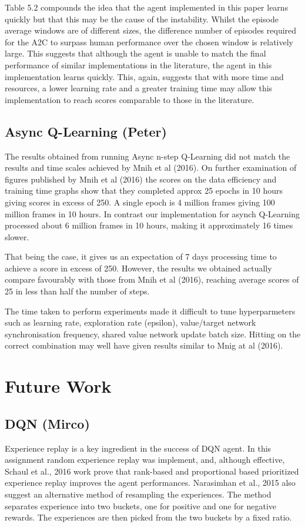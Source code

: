 \documentclass{article}
\begin{document}
Table 5.2 compounds the idea that the agent implemented in this paper learns quickly but that this may be the cause of the instability. Whilst the episode average windows are of different sizes, the difference number of episodes required for the A2C to surpass human performance over the chosen window is relatively large. This suggests that although the agent is unable to match the final performance of similar implementations in the literature, the agent in this implementation learns quickly. This, again, suggests that with more time and resources, a lower learning rate and a greater training time may allow this implementation to reach scores comparable to those in the literature.

\subsection{Async Q-Learning (Peter)}

The results obtained from running Async n-step Q-Learning did not match the results and time scales achieved by Mnih et al (2016). On further examination of figures published by Mnih et al (2016) the scores on the data efficiency and training time graphs show that they completed approx 25 epochs in 10 hours giving scores in excess of 250. A single epoch is 4 million frames giving 100 million frames in 10 hours. In contrast our implementation for asynch Q-Learning processed about 6 million frames in 10 hours, making it approximately 16 times slower.

That being the case, it gives us an expectation of 7 days processing time to achieve a score in excess of 250. However, the results we obtained actually compare favourably with those from Mnih et al (2016), reaching average scores of 25 in less than half the number of steps.

The time taken to perform experiments made it difficult to tune hyperparmeters such as learning rate, exploration rate (epsilon), value/target network synchronisation frequency, shared value network update batch size. Hitting on the correct combination may well have given results similar to Mnig at al (2016).

\section{Future Work}

\subsection{DQN (Mirco)}
Experience replay is a key ingredient in the success of DQN agent. In this assignment random experience replay was implement, and, although effective, Schaul et al., 2016 work prove that rank-based and proportional based prioritized experience replay improves the agent performances. Narasimhan et al., 2015 also suggest an alternative method of resampling the experiences. The method separates experience into two buckets, one for positive and one for negative rewards. The experiences are then picked from the two buckets by a fixed ratio.
\end{document}
